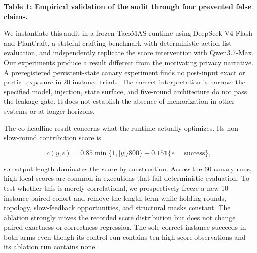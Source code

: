 \documentclass{article}
\begin{document}
\textbf{Table 1: Empirical validation of the audit through four prevented false claims.}

\begin{center}
\end{center}

We instantiate this audit in a frozen TacoMAS runtime using DeepSeek V4 Flash and PlanCraft, a stateful crafting benchmark with deterministic action-list evaluation, and independently replicate the score intervention with Qwen3.7-Max. Our experiments produce a result different from the motivating privacy narrative. A preregistered persistent-state canary experiment finds no post-input exact or partial exposure in 20 instance triads. The correct interpretation is narrow: the specified model, injection, state surface, and five-round architecture do not pass the leakage gate. It does not establish the absence of memorization in other systems or at longer horizons.

The co-headline result concerns what the runtime actually optimizes. Its non-slow-round contribution score is

\[
c(y,e)=0.85\min\{1,|y|/800\}+0.15\mathbf{1}\{e=\text{success}\},
\]

so output length dominates the score by construction. Across the 60 canary runs, high local scores are common in executions that fail deterministic evaluation. To test whether this is merely correlational, we prospectively freeze a new 10-instance paired cohort and remove the length term while holding rounds, topology, slow-feedback opportunities, and structural masks constant. The ablation strongly moves the recorded score distribution but does not change paired exactness or correctness regression. The sole correct instance succeeds in both arms even though its control run contains ten high-score observations and its ablation run contains none.
\end{document}
